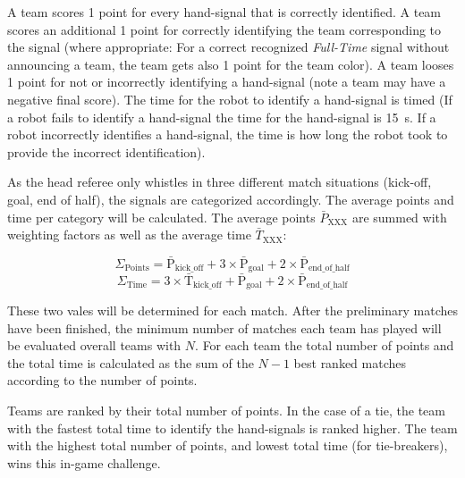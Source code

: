 A team scores 1 point for every hand-signal that is correctly identified. A team scores an additional 1 point for correctly identifying the team corresponding to the signal (where appropriate: For a correct recognized \textit{Full-Time} signal without announcing a team, the team gets also 1 point for the team color). A team looses 1 point for not or incorrectly identifying a hand-signal (note a team may have a negative final score). The time for the robot to identify a hand-signal is timed (If a robot fails to identify a hand-signal the time for the hand-signal is \qty{15}{\second}. If a robot incorrectly identifies a hand-signal, the time is how long the robot took to provide the incorrect identification).

As the head referee only whistles in three different match situations (kick-off, goal, end of half), the signals are categorized accordingly. The average points and time per category will be calculated. The average points $\bar{P}_{\mathrm{XXX}}$ are summed with weighting factors as well as the average time $\bar{T}_{\mathrm{XXX}}$:

\begin{equation*}
    \Sigma_\mathrm{Points} = \bar{\mathrm{P}}_{\mathrm{kick\_off}} + 3 \times \bar{\mathrm{P}}_{\mathrm{goal}} + 2 \times \bar{\mathrm{P}}_{\mathrm{end\_of\_half}}
\end{equation*}
\begin{equation*}
    \Sigma_\mathrm{Time} = 3 \times \bar{\mathrm{T}}_{\mathrm{kick\_off}} + \bar{\mathrm{P}}_{\mathrm{goal}} + 2 \times \bar{\mathrm{P}}_{\mathrm{end\_of\_half}}
\end{equation*}

These two vales will be determined for each match. After the preliminary matches have been finished, the minimum number of matches each team has played will be evaluated overall teams with $N$. For each team the total number of points and the total time is calculated as the sum of the $N - 1$ best ranked matches according to the number of points.

Teams are ranked by their total number of points. In the case of a tie, the team with the fastest total time to identify the hand-signals is ranked higher. The team with the highest total number of points, and lowest total time (for tie-breakers), wins this in-game challenge.
